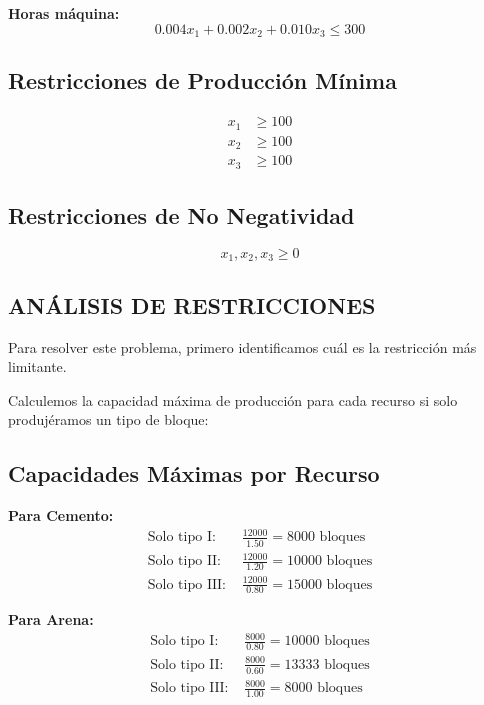 \documentclass[12pt, a4paper, oneside]{book}
\theoremstyle{definition}
\begin{document}
    \textbf{Horas máquina:}
    \begin{equation}
    0.004x_1 + 0.002x_2 + 0.010x_3 \leq 300
    \end{equation}

    \subsection{Restricciones de Producción Mínima}

    \begin{align}
    x_1 &\geq 100 \\
    x_2 &\geq 100 \\
    x_3 &\geq 100
    \end{align}

    \subsection{Restricciones de No Negatividad}

    \begin{equation}
    x_1, x_2, x_3 \geq 0
    \end{equation}

    \subsection{ANÁLISIS DE RESTRICCIONES}

    Para resolver este problema, primero identificamos cuál es la restricción más limitante.

    Calculemos la capacidad máxima de producción para cada recurso si solo produjéramos un tipo de bloque:

    \subsection{Capacidades Máximas por Recurso}

    \textbf{Para Cemento:}
    \begin{align}
    \text{Solo tipo I: } &\frac{12000}{1.50} = 8000 \text{ bloques} \\
    \text{Solo tipo II: } &\frac{12000}{1.20} = 10000 \text{ bloques} \\
    \text{Solo tipo III: } &\frac{12000}{0.80} = 15000 \text{ bloques}
    \end{align}

    \textbf{Para Arena:}
    \begin{align}
    \text{Solo tipo I: } &\frac{8000}{0.80} = 10000 \text{ bloques} \\
    \text{Solo tipo II: } &\frac{8000}{0.60} = 13333 \text{ bloques} \\
    \text{Solo tipo III: } &\frac{8000}{1.00} = 8000 \text{ bloques}
    \end{align}
\end{document}
